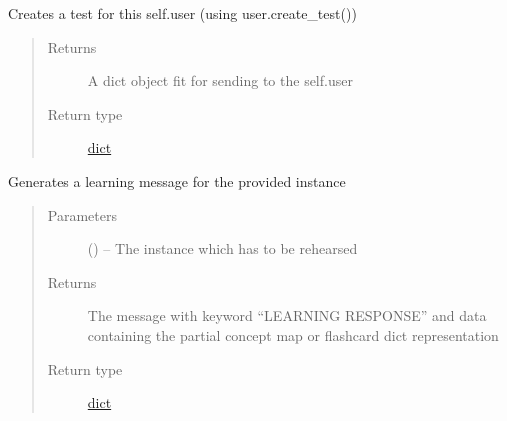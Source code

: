 \documentclass[letterpaper,10pt,english]{sphinxmanual}
\begin{document}
\begin{fulllineitems}
\begin{fulllineitems}
\end{fulllineitems}


\begin{fulllineitems}
\label{\detokenize{consumer:consumer.Consumer.create_test}}
Creates a test for this self.user (using user.create\_test())
\begin{quote}\begin{description}
\item[{Returns}] \leavevmode
A dict object fit for sending to the self.user

\item[{Return type}] \leavevmode
\href{https://docs.python.org/2/library/stdtypes.html\#dict}{dict}

\end{description}\end{quote}

\end{fulllineitems}


\begin{fulllineitems}
\label{\detokenize{consumer:consumer.Consumer.learning_message}}
Generates a learning message for the provided instance
\begin{quote}\begin{description}
\item[{Parameters}] \leavevmode
{} ({\hyperref[\detokenize{instance:instance.Instance}]{}}) -- The instance which has to be rehearsed

\item[{Returns}] \leavevmode
The message with keyword ``LEARNING RESPONSE'' and data containing the partial concept map or flashcard dict representation

\item[{Return type}] \leavevmode
\href{https://docs.python.org/2/library/stdtypes.html\#dict}{dict}

\end{description}\end{quote}

\end{fulllineitems}



\end{fulllineitems}
\end{document}
